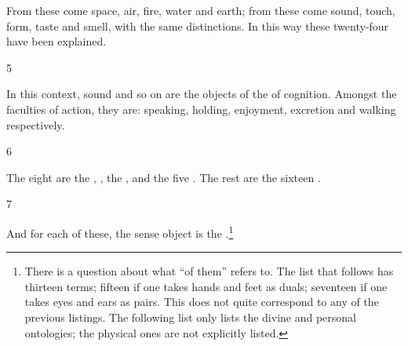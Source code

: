 \begin{translation}
    From these  come space, air, fire, water and earth; 
    from these come sound, touch, form, taste and smell, with the same 
    distinctions.  In this way these twenty-four  have 
    been explained. 
            
\item[5]    

In this context, sound and so on are the objects of the  of 
cognition.  Amongst the faculties of action, they are: speaking, holding, 
enjoyment, excretion and walking respectively.  

\item[6]

The eight  are 
the ,
, 
the , 
and the five .
The rest are the sixteen .
    
\item[7]   

And for each of these, the sense object is the 
.\footnote{There is a question about what
    ``of them'' refers to.  The list that follows has thirteen terms;
    fifteen if one takes hands and feet as duals; seventeen if one takes
    eyes and ears as pairs.  This does not quite correspond to any of the
    previous listings.   The following list only lists the divine and personal
    ontologies; the physical ones are not explicitly listed.
    
}
\end{translation}
